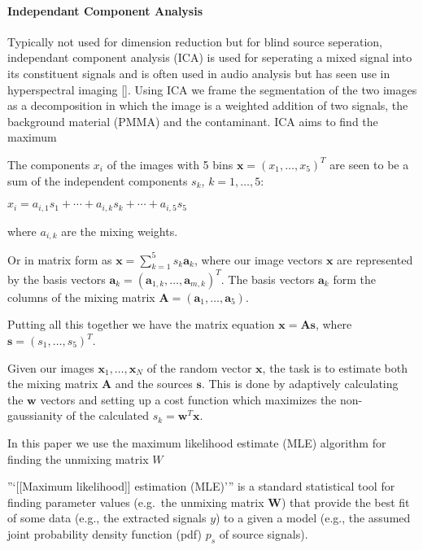 \documentclass[11pt]{article}
\begin{document}
    \hypertarget{independant-component-analysis}{%
\paragraph{Independant Component
Analysis}\label{independant-component-analysis}}



    Typically not used for dimension reduction but for blind source
seperation, independant component analysis (ICA) is used for seperating
a mixed signal into its constituent signals and is often used in audio
analysis but has seen use in hyperspectral imaging \ref{}. Using ICA we
frame the segmentation of the two images as a decomposition in which the
image is a weighted addition of two signals, the background material
(PMMA) and the contaminant. ICA aims to find the maximum

The components \(x_i\) of the images with 5 bins
\(\boldsymbol{x}=(x_1,\ldots,x_5)^T\) are seen to be a sum of the
independent components \(s_k\), \(k=1,\ldots,5\):

\(x_i = a_{i,1} s_1 + \cdots + a_{i,k} s_k + \cdots + a_{i,5} s_5\)

where \(a_{i,k}\) are the mixing weights.

Or in matrix form as
\(\boldsymbol{x}=\sum_{k=1}^{5} s_k \boldsymbol{a}_k\), where our image
vectors \(\boldsymbol{x}\) are represented by the basis vectors
\(\boldsymbol{a}_k=(\boldsymbol{a}_{1,k},\ldots,\boldsymbol{a}_{m,k})^T\).
The basis vectors \(\boldsymbol{a}_k\) form the columns of the mixing
matrix \(\boldsymbol{A}=(\boldsymbol{a}_1,\ldots,\boldsymbol{a}_5)\).

Putting all this together we have the matrix equation
\(\boldsymbol{x}=\boldsymbol{A} \boldsymbol{s}\), where
\(\boldsymbol{s}=(s_1,\ldots,s_5)^T\).

Given our images \(\boldsymbol{x}_1,\ldots,\boldsymbol{x}_N\) of the
random vector \(\boldsymbol{x}\), the task is to estimate both the
mixing matrix \(\boldsymbol{A}\) and the sources \(\boldsymbol{s}\).
This is done by adaptively calculating the \(\boldsymbol{w}\) vectors
and setting up a cost function which maximizes the non-gaussianity of
the calculated \(s_k = \boldsymbol{w}^T \boldsymbol{x}\).

In this paper we use the maximum likelihood estimate (MLE) algorithm for
finding the unmixing matrix \(W\)

''`{[}{[}Maximum likelihood{]}{]} estimation (MLE)''' is a standard
statistical tool for finding parameter values (e.g.~the unmixing matrix
\(\mathbf{W}\)) that provide the best fit of some data (e.g., the
extracted signals \(y\)) to a given a model (e.g., the assumed joint
probability density function (pdf) \(p_s\) of source signals).
\end{document}
